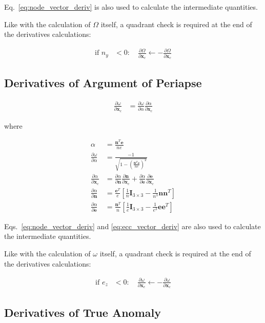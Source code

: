 \documentclass[]{article}
\newcommand{\vb}[1]{\bm{#1}} %
\newcommand{\pd}[2]{\frac{\partial #1}{\partial #2}} %
\newcommand{\xc}[0]{\vb{x}_c}
\begin{document}
\noindent Eq.~\eqref{eq:node_vector_deriv} is also used to calculate the intermediate quantities.

Like with the calculation of $\Omega$ itself, a quadrant check is required at the end of the derivatives calculations:

\begin{align}
\text{if } n_y &< 0: \quad \pd{\Omega}{\xc} \leftarrow - \pd{\Omega}{\xc}
\end{align}

\subsection{Derivatives of Argument of Periapse}

\begin{align}
\label{eq:aop_deriv}
\pd{\omega}{\xc} &= \pd{\omega}{\alpha} \pd{\alpha}{\xc}
\end{align}

\noindent where

\begin{align}
\alpha &= \frac{\vb{n}^T \vb{e}}{ne} \\
\pd{\omega}{\alpha} &= \frac{-1}{\sqrt{1 - \left( \frac{\vb{n}^T \vb{e}}{n e} \right)^2}} \\
\pd{\alpha}{\xc} &= \pd{\alpha}{\vb{n}} \pd{\vb{n}}{\xc} + \pd{\alpha}{\vb{e}} \pd{\vb{e}}{\xc} \\
 \pd{\alpha}{\vb{n}} &= \frac{\vb{e}^T}{e} \left[ \frac{1}{n} \vb{I}_{3 \times 3} - \frac{1}{n^3} \vb{n} \vb{n}^T \right] \\
 \pd{\alpha}{\vb{e}} &= \frac{\vb{n}^T}{n} \left[ \frac{1}{e} \vb{I}_{3 \times 3} - \frac{1}{e^3} \vb{e} \vb{e}^T \right]
\end{align}

\noindent Eqs.~\eqref{eq:node_vector_deriv} and \eqref{eq:ecc_vector_deriv} are also used to calculate the intermediate quantities.

Like with the calculation of $\omega$ itself, a quadrant check is required at the end of the derivatives calculations:

\begin{align}
\text{if } e_z &< 0: \quad \pd{\omega}{\xc} \leftarrow - \pd{\omega}{\xc}
\end{align}

\subsection{Derivatives of True Anomaly}
\end{document}
